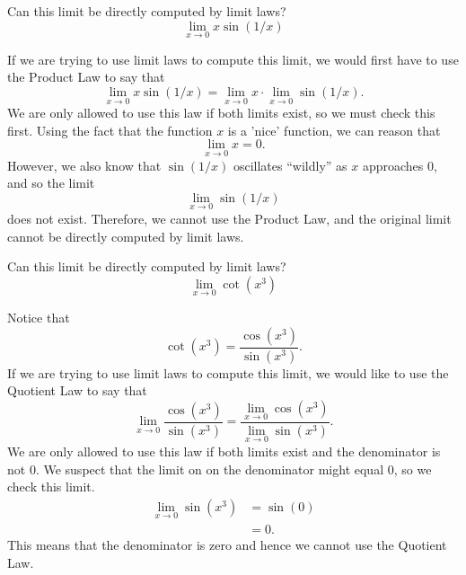 \documentclass{ximera}
\begin{document}
\begin{question}
  Can this limit be directly computed by limit laws?
  \[
  \displaystyle\lim_{x\to 0} x\sin(1/x)
  \]
  \begin{multipleChoice}
  \end{multipleChoice}
  \begin{feedback}
    If we are trying to use limit laws to compute this limit, we would
    first have to use the Product Law to say that
    \[
    \displaystyle\lim_{x\to 0}x\sin(1/x)= \lim_{x\to 0} x \cdot \lim_{x\to 0} \sin(1/x).
    \]
    We are only allowed to use this law if both limits exist, so we
    must check this first.  Using the fact that the function $x$ is a 'nice' function, we can reason that
    \[
    \displaystyle\lim_{x\to  0}x=0.
    \]
    However, we also know that $\sin(1/x)$ oscillates ``wildly'' as
    $x$ approaches $0$, and so the limit
    \[
    \lim_{x\to 0} \sin(1/x)
    \]does not exist.  Therefore, we cannot use the
    Product Law, and the original limit cannot be directly computed by limit laws.
  \end{feedback}
\end{question}


\begin{question}
  Can this limit be directly computed by limit laws?
  \[
  \displaystyle\lim_{x\to 0} \cot(x^3)
  \]
  \begin{multipleChoice}
  \end{multipleChoice}
  \begin{feedback}
    Notice that
    \[
    \cot(x^3) = \frac{\cos(x^3)}{\sin(x^3)}.
    \]
    If we are trying to use limit laws to compute this limit, we would
    like to use the Quotient Law to say that
    \[
    \displaystyle\lim_{x\to 0} \frac{\cos(x^3)}{\sin(x^3)} = \displaystyle\frac{\lim_{x\to 0}
      \cos(x^3)}{\lim_{x\to 0} \sin(x^3)}.
    \]
    We are only allowed to use this law if both limits exist and the
    denominator is not $0$. We suspect that the limit on on the
    denominator might equal $0$, so we check this limit.
    \begin{align*}
      \displaystyle\lim_{x\to 0} \sin(x^3) &= 
\sin(0) \\
      &=0.
  \end{align*}
  This means that the denominator is zero and hence we cannot use the
  Quotient Law.
  \end{feedback}
\end{question}
\end{document}
